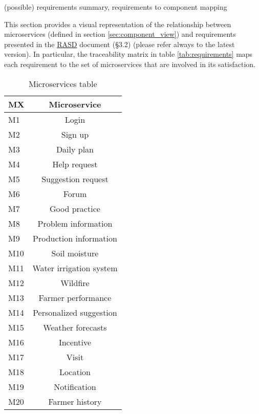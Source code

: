 (possible) requirements summary, requirements to component mapping

This section provides a visual representation of the relationship between microservices (defined in section \ref{sec:component_view}) and requirements presented in the \href{https://github.com/MarcoRomanini/GoriRomaniniWatanabe/tree/main/DeliveryFolder}{RASD} document (\S 3.2) (please refer always to the latest version). In particular, the traceability matrix in table \ref{tab:requirements} maps each requirement to the set of microservices that are involved in its satisfaction.

\begin{table}[H]
    \setlength\arrayrulewidth{1pt}
    \centering
    \begin{tabular}{|l|c|}
        \rowcolor{myblue}
        \hline
        \color{white}MX & \color{white}Microservice\\
        \hline
        M1      &   Login\\
        \hline
        M2      &   Sign up\\
        \hline
        M3      &   Daily plan\\
        \hline
        M4      &   Help request\\
        \hline
        M5      &   Suggestion request\\
        \hline
        M6      &   Forum\\
        \hline
        M7      &   Good practice\\
        \hline
        M8      &   Problem information\\
        \hline
        M9      &   Production information\\
        \hline
        M10      &   Soil moisture\\
        \hline
        M11      &   Water irrigation system\\
        \hline
        M12      &   Wildfire\\
        \hline
        M13      &   Farmer performance\\
        \hline
        M14      &   Personalized suggestion\\
        \hline
        M15      &   Weather forecasts\\
        \hline
        M16      &   Incentive\\
        \hline
        M17     & Visit \\
        \hline
        M18     & Location\\
        \hline
        M19     & Notification\\
        \hline
        M20     & Farmer history\\
        \hline
    \end{tabular}
    
    \caption{\label{tab:microservices_table}Microservices table}
    
\end{table}


